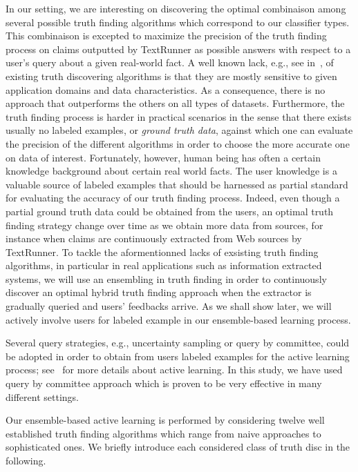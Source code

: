 In our setting, we are interesting on discovering the optimal combinaison among several possible truth finding algorithms
which correspond to our classifier types.
This combinaison is excepted to maximize the precision of the truth finding process on claims outputted by TextRunner as 
possible answers with respect to a user's query about a given real-world fact.
A well known lack, e.g., see in~\cite{Li12, Wagui14}, of existing truth discovering algorithms is that they are mostly sensitive
to given application domains and data characteristics. As a consequence, there is no approach that outperforms the others on all 
types of datasets. Furthermore, the truth finding process is harder in practical scenarios in the sense that there exists usually 
no labeled examples, or \emph{ground truth data}, against which one can evaluate the precision of the different algorithms in order to choose
the more accurate one on data of interest.  Fortunately, however, human being has often a certain knowledge background about certain real world facts.
The user knowledge is a valuable source of labeled examples that should be harnessed as partial standard for evaluating the accuracy of our truth finding 
process. Indeed, even though a partial ground truth data could be obtained from the users, an optimal truth finding strategy change over time as we obtain
more data from sources, for instance when claims are continuously extracted from Web sources by TextRunner.
To tackle the aformentionned lacks of exsisting truth finding algorithms, in particular in real applications such as information extracted systems, 
we will use an ensembling in truth finding in order to continuously discover an optimal hybrid truth finding approach when the extractor is gradually
queried and users' feedbacks arrive. As we shall show later, we will actively involve users for labeled example in our ensemble-based learning process.

Several query strategies, e.g., uncertainty sampling or query by committee, could be adopted in order to obtain from users labeled
examples for the active learning process; see~\cite{burr12} for more details about active learning. In this study, we have used query 
by committee approach which is proven to be very effective in many different settings.



Our ensemble-based active learning is performed by considering twelve well established truth finding algorithms which range from naive approaches
to sophisticated ones. We briefly introduce each considered class of truth disc in the following.

